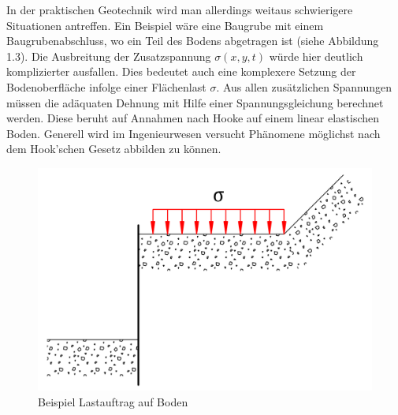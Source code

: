 In der praktischen Geotechnik wird man allerdings weitaus schwierigere Situationen antreffen.
Ein Beispiel wäre eine Baugrube mit einem Baugrubenabschluss, wo ein Teil des Bodens abgetragen ist (siehe Abbildung 1.3).
Die Ausbreitung der Zusatzspannung $\sigma(x,y,t)$ würde hier deutlich komplizierter ausfallen.
Dies bedeutet auch eine komplexere Setzung der Bodenoberfläche infolge einer Flächenlast $\sigma$.
Aus allen zusätzlichen Spannungen müssen die adäquaten Dehnung mit Hilfe einer Spannungsgleichung berechnet werden.
Diese beruht auf Annahmen nach Hooke auf einem linear elastischen Boden.
Generell wird im Ingenieurwesen versucht Phänomene möglichst nach dem Hook'schen Gesetz abbilden zu können.

\begin{figure}
	\centering
	\includegraphics[width=0.5\linewidth,keepaspectratio]{papers/spannung/Grafiken/Bild3.png}
	\caption{Beispiel Lastauftrag auf Boden}
	\label{fig:Bild3}
\end{figure}